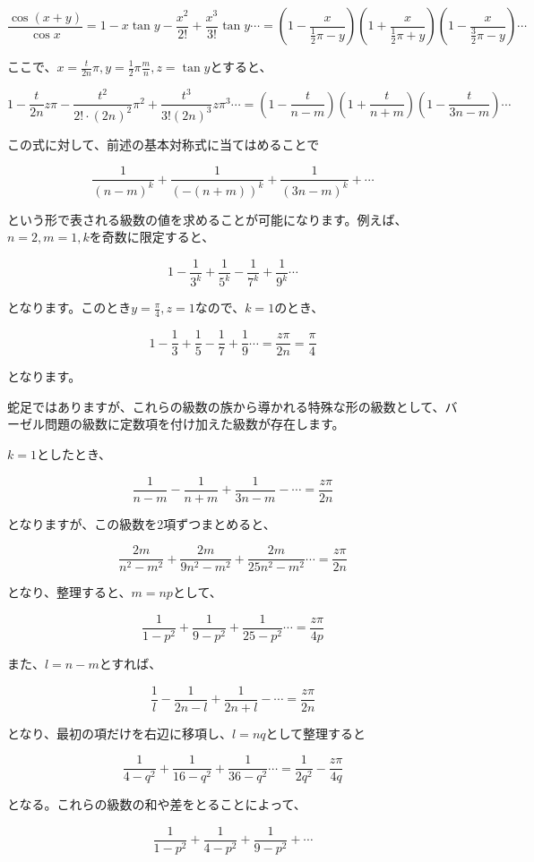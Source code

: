 \documentclass[a4paper]{jsarticle}
\theoremstyle{break}
\begin{document}
\[\frac{\cos (x+y)}{\cos x}=1 -x\tan y- \frac{x^2}{2!}+\frac{x^3}{3!}\tan y\cdots=\left( 1-\frac{x}{\frac{1}{2}\pi -y} \right)\left( 1+\frac{x}{\frac{1}{2}\pi+y} \right)\left( 1-\frac{x}{\frac{3}{2}\pi-y} \right)\cdots\]

ここで、$x=\frac{t}{2n}\pi ,y=\frac{1}{2}\pi \frac{m}{n},z=\tan y$とすると、

\[1 -\frac{t}{2n}z\pi - \frac{t^2}{2!\cdot (2n)^2}\pi^2+\frac{t^3}{3!(2n)^3}z\pi^3\cdots=\left( 1-\frac{t}{n-m} \right)\left( 1+\frac{t}{n+m} \right)\left( 1-\frac{t}{3n-m} \right)\cdots\]

この式に対して、前述の基本対称式に当てはめることで

\[\frac{1}{(n-m)^k}+\frac{1}{(-(n+m))^k}+\frac{1}{(3n-m)^k}+\cdots\]

という形で表される級数の値を求めることが可能になります。例えば、$n=2,m=1,k$を奇数に限定すると、

\[1-\frac{1}{3^k}+\frac{1}{5^k}-\frac{1}{7^k}+\frac{1}{9^k}\cdots\]

となります。このとき$y=\frac{\pi}{4},z=1$なので、$k=1$のとき、

\[1-\frac{1}{3}+\frac{1}{5}-\frac{1}{7}+\frac{1}{9}\cdots=\frac{z\pi}{2n}=\frac{\pi}{4}\]

となります。

蛇足ではありますが、これらの級数の族から導かれる特殊な形の級数として、バーゼル問題の級数に定数項を付け加えた級数が存在します。

$k=1$としたとき、

\[\frac{1}{n-m}-\frac{1}{n+m}+\frac{1}{3n-m}-\cdots=\frac{z\pi}{2n}\]

となりますが、この級数を2項ずつまとめると、

\[\frac{2m}{n^2-m^2}+\frac{2m}{9n^2-m^2}+\frac{2m}{25n^2-m^2}\cdots=\frac{z\pi}{2n}\]

となり、整理すると、$m=np$として、

\[\frac{1}{1-p^2}+\frac{1}{9-p^2}+\frac{1}{25-p^2}\cdots=\frac{z\pi}{4p}\]

また、$l=n-m$とすれば、

\[\frac{1}{l}-\frac{1}{2n-l}+\frac{1}{2n+l}-\cdots=\frac{z\pi}{2n}\]

となり、最初の項だけを右辺に移項し、$l=nq$として整理すると

\[\frac{1}{4-q^2}+\frac{1}{16-q^2}+\frac{1}{36-q^2}\cdots=\frac{1}{2q^2}-\frac{z\pi}{4q}\]

となる。これらの級数の和や差をとることによって、

\[\frac{1}{1-p^2}+\frac{1}{4-p^2}+\frac{1}{9-p^2}+\cdots\]
\end{document}
